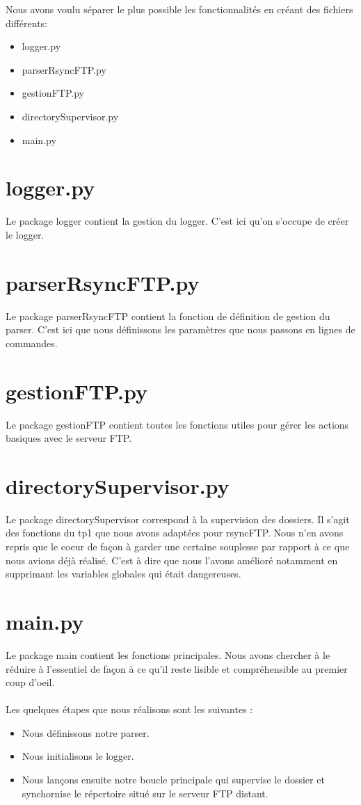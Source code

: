Nous avons voulu séparer le plus possible les fonctionnalités en créant des fichiers différents: 
\begin{itemize}
\item logger.py
\item parserRsyncFTP.py
\item gestionFTP.py
\item directorySupervisor.py
\item main.py
\end{itemize}

\section{logger.py}	

Le package logger contient la gestion du logger. C'est ici qu'on s'occupe de créer le logger.

\section{parserRsyncFTP.py}

Le package parserRsyncFTP contient la fonction de définition de gestion du parser. 
C'est ici que nous définissons les paramètres que nous passons en lignes de commandes.

\section{gestionFTP.py}

Le package gestionFTP contient toutes les fonctions utiles pour gérer les actions basiques avec le serveur FTP.

\section{directorySupervisor.py}

Le package directorySupervisor correspond à la supervision des dossiers. 
Il s'agit des fonctions du tp1 que nous avons adaptées pour rsyncFTP. 
Nous n'en avons repris que le coeur de façon à garder une certaine souplesse par rapport à ce que nous avions déjà réalisé.
C'est à dire que nous l'avons amélioré notamment en supprimant les variables globales qui était dangereuses.

\section{main.py}

Le package main contient les fonctions principales. 
Nous avons chercher à le réduire à l'essentiel de façon à ce qu'il reste lisible et compréhensible au premier coup d'oeil.\\
\\
Les quelques étapes que nous réalisons sont les suivantes :
\begin{itemize}
\item Nous définissons notre parser.
\item Nous initialisons le logger.
\item Nous lançons ensuite notre boucle principale qui supervise le dossier et synchornise le répertoire situé sur le serveur FTP distant.
\end{itemize}
